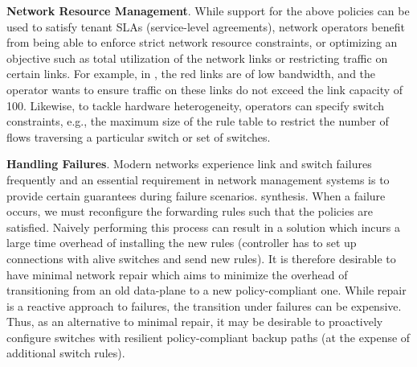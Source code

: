 \begin{compactitemize}
\item \textbf{Network Resource Management}. While support for the
  above policies can be used to satisfy tenant SLAs (service-level
  agreements), network operators benefit from being able to enforce
  strict network resource constraints, or optimizing an objective such
  as total utilization of the network links or restricting traffic on
  certain links. For example, in , the red
  links are of low bandwidth, and the operator wants to ensure traffic
  on these links do not exceed the link capacity of 100.
  Likewise, to tackle hardware heterogeneity, operators can specify
  switch constraints, e.g., the maximum size of the rule table to
  restrict the number of flows traversing a particular switch or set
  of switches.
 
 \item \textbf{Handling Failures}. Modern networks experience link and switch failures
 frequently and an essential requirement in network management systems is to
 provide certain guarantees during failure scenarios. 
 synthesis.  When a failure occurs, we must reconfigure the forwarding
 rules such that the policies are satisfied. Naively performing this
 process can result in a solution which incurs a large time overhead
 of installing the new rules (controller has to set up connections
 with alive switches and send new rules). It is therefore desirable to
 have minimal network repair which aims to minimize the overhead of
 transitioning from an old data-plane to a new policy-compliant
 one. While repair is a reactive approach to failures, the transition
 under failures can be expensive. Thus, as an alternative to minimal
 repair, it may be desirable to proactively configure switches with
 resilient policy-compliant backup paths (at the expense of additional
 switch rules).
\end{compactitemize}


